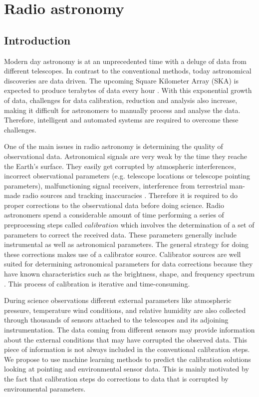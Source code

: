 \chapter{Radio astronomy}

\section{Introduction}


Modern day astronomy is at an unprecedented time with a deluge of data from different telescopes. In contrast
to the conventional methods, today astronomical discoveries are data driven. The upcoming Square Kilometer Array (SKA) is expected to produce terabytes of data every hour \citep{aniyan2017classifying}. With this exponential growth of data, challenges for data calibration, reduction and analysis also increase, making it difficult for astronomers to manually process and analyse the data. Therefore, intelligent and automated systems are required  to overcome these challenges.

One of the main issues in radio astronomy is determining the quality of observational data. Astronomical signals are very weak  by the time they reache the Earth’s surface. They easily get corrupted by  atmospheric interferences, incorrect observational parameters (e.g. telescope locations or telescope pointing parameters), malfunctioning signal receivers, interference from terrestrial man-made radio sources and tracking inaccuracies \citep{taylor1999synthesis}. Therefore it is required to do proper corrections to the observational data before doing science. Radio astronomers spend a considerable amount of time performing a series of preprocessing steps called $\textit{calibration}$ which involves the determination of a set of parameters to correct the received data. These parameters generally include instrumental as well as astronomical parameters. The general strategy for doing these corrections makes use of a calibrator source. Calibrator sources are well suited for determining astronomical parameters for data corrections because they have known characteristics such as the brightness, shape, and frequency spectrum \citep{taylor1999synthesis}. This process of calibration is iterative and time-consuming.

During science observations different  external parameters like atmospheric pressure, temperature  wind conditions, and relative humidity  are also collected through thousands of sensors attached to the telescopes and its adjoining instrumentation. The data coming from different sensors may provide information about the external conditions that may have corrupted the observed data. This piece of information is not always included in the conventional calibration steps. We propose to use machine learning methods to predict the calibration solutions looking at pointing and environmental sensor data. This is mainly motivated by the fact that calibration steps do corrections to data that is corrupted by environmental parameters.

